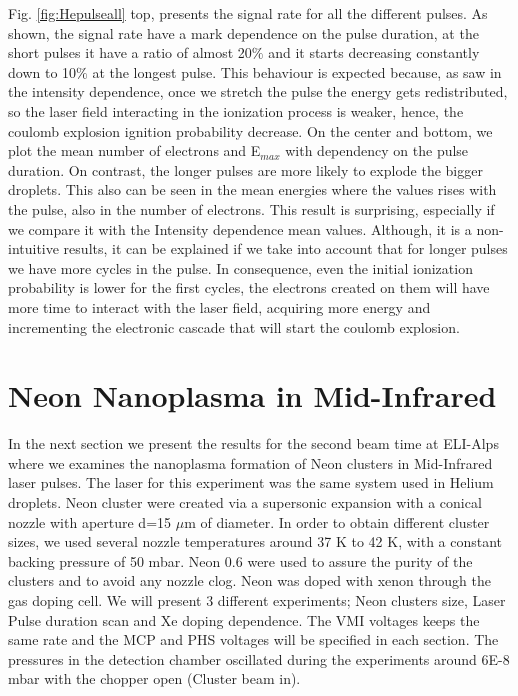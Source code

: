 Fig. \ref{fig:Hepulseall} top, presents the signal rate for all the different pulses. As shown, the signal rate have a mark dependence on the  pulse duration, at the short pulses it have a ratio of almost 20$\%$  and it starts decreasing constantly  down to  10$\%$ at the longest pulse.  This behaviour is expected because, as saw in the intensity dependence, once we stretch the pulse the energy gets redistributed, so the laser field interacting in the ionization process is weaker, hence, the coulomb explosion ignition probability decrease. On the center and bottom, we plot the mean number of electrons and E$_{max}$  with dependency on the pulse duration. On contrast, the longer pulses are more likely to explode the bigger droplets. This also can be seen in the mean energies where the values rises with the pulse, also in the number of electrons. This result is surprising, especially if we compare it with the Intensity dependence mean values. Although, it is a non-intuitive results, it can be explained if we take into account that for longer pulses we have more cycles in the pulse. In consequence, even the initial ionization probability is lower for the first cycles, the electrons created on them will have more time to interact with the laser field, acquiring more energy and incrementing the electronic cascade that will start the coulomb explosion.


\section{Neon Nanoplasma in Mid-Infrared}

In the next section we present the results for the second beam time at ELI-Alps where we examines the nanoplasma formation of Neon clusters in Mid-Infrared laser pulses. The laser for this experiment was the same system used in Helium droplets. Neon cluster were created via a supersonic expansion with a conical nozzle with aperture d=15 $\mu$m of diameter. In order to obtain different cluster sizes, we used several nozzle temperatures around 37 K to 42 K, with a constant backing pressure of 50 mbar. Neon 0.6 were used to assure the purity of the clusters and to avoid any nozzle clog. Neon was doped with xenon through the gas doping cell. We will present 3 different experiments; Neon clusters size, Laser Pulse duration scan and Xe doping dependence. The VMI voltages keeps the same rate and the MCP and PHS voltages will be specified in each section. The pressures in the detection chamber oscillated during the experiments around 6E-8 mbar with the chopper open (Cluster beam in).  

